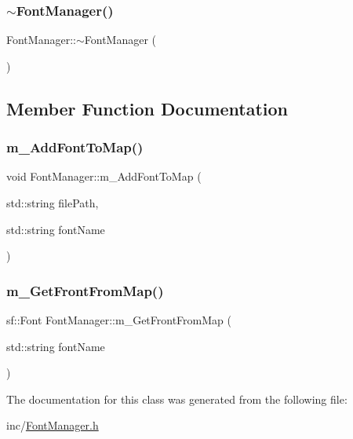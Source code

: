 \subsubsection{\texorpdfstring{$\sim$\+Font\+Manager()}{~FontManager()}}
{\footnotesize\ttfamily Font\+Manager\+::$\sim$\+Font\+Manager (\begin{DoxyParamCaption}{ }\end{DoxyParamCaption})}



\subsection{Member Function Documentation}
\mbox{\label{class_font_manager_a54d5fbb26b5b7ae75862d8250832f0ad}} 
\subsubsection{\texorpdfstring{m\+\_\+\+Add\+Font\+To\+Map()}{m\_AddFontToMap()}}
{\footnotesize\ttfamily void Font\+Manager\+::m\+\_\+\+Add\+Font\+To\+Map (\begin{DoxyParamCaption}\item[{std\+::string}]{file\+Path,  }\item[{std\+::string}]{font\+Name }\end{DoxyParamCaption})}

\mbox{\label{class_font_manager_a467be1ef00c39800ac03107a768ff23c}} 
\subsubsection{\texorpdfstring{m\+\_\+\+Get\+Front\+From\+Map()}{m\_GetFrontFromMap()}}
{\footnotesize\ttfamily sf\+::\+Font Font\+Manager\+::m\+\_\+\+Get\+Front\+From\+Map (\begin{DoxyParamCaption}\item[{std\+::string}]{font\+Name }\end{DoxyParamCaption})}



The documentation for this class was generated from the following file\+:\begin{DoxyCompactItemize}
\item 
inc/\mbox{\hyperlink{_font_manager_8h}{Font\+Manager.\+h}}\end{DoxyCompactItemize}
